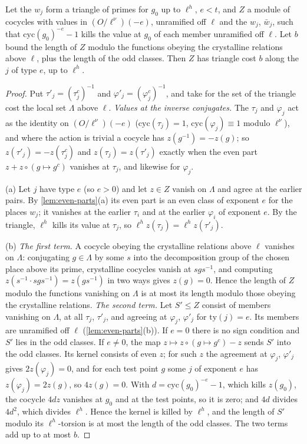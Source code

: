 \begin{theorem}\label{thm:triangle-cost}
Let the $w_j$ form a triangle of primes for $g_0$ up to $\ell^h$, $e<t$, and $Z$ a module of cocycles with values in $(O/\ell^\nu)(-e)$, unramified off $\ell$ and the $w_j$, $\bar w_j$, such that $\mathrm{cyc}(g_0)^{-e}-1$ kills the value at
$g_0$ of each member unramified off $\ell$. Let $b$ bound the length of $Z$ modulo the functions obeying the crystalline relations above $\ell$, plus the length of the odd classes. Then $Z$ has triangle cost $b$ along the $j$
of type $e$, up to $\ell^h$.
\end{theorem}

\begin{proof}
Put $\tau'_j=(\tau_j^c)^{-1}$ and $\varphi'_j=(\varphi_j^c)^{-1}$, and take for the set of the triangle cost the local set $\Lambda$ above $\ell$. \emph{Values at the inverse conjugates.} The $\tau_j$ and $\varphi_j$ act as the identity on $(O/\ell^\nu)(-e)$
($\mathrm{cyc}(\tau_j)=1$, $\mathrm{cyc}(\varphi_j)\equiv1$ modulo $\ell^\nu$), and where the action is trivial a cocycle has $z(g^{-1})=-z(g)$; so $z(\tau'_j)=-z(\tau_j^c)$ and $z(\tau_j)=z(\tau'_j)$ exactly when the even part $z+z\circ(g\mapsto g^c)$ vanishes at
$\tau_j$, and likewise for $\varphi_j$.

(a) Let $j$ have type $e$ (so $e>0$) and let $z\in Z$ vanish on $\Lambda$ and agree at the earlier pairs. By \cref{lem:even-parts}(a) its even part is an even class of exponent $e$ for the places $w_j$; it vanishes at the earlier $\tau_i$ and
at the earlier $\varphi_i$ of exponent $e$. By the triangle, $\ell^h$ kills its value at $\tau_j$, so $\ell^hz(\tau_j)=\ell^hz(\tau'_j)$.

(b) \emph{The first term.} A cocycle obeying the crystalline relations above $\ell$ vanishes on $\Lambda$: conjugating $g\in\Lambda$ by some $s$ into the decomposition group of the chosen place above its prime, crystalline cocycles vanish at
$sgs^{-1}$, and computing $z(s^{-1}\cdot sgs^{-1})=z(gs^{-1})$ in two ways gives $z(g)=0$. Hence the length of $Z$ modulo the functions vanishing on $\Lambda$ is at most its length modulo those obeying the crystalline relations.
\emph{The second term.} Let $S'\le Z$ consist of members vanishing on $\Lambda$, at all $\tau_j$, $\tau'_j$, and agreeing at $\varphi_j$, $\varphi'_j$ for $\mathrm{ty}(j)=e$. Its members are unramified off $\ell$ (\cref{lem:even-parts}(b)). If $e=0$ there is no sign condition and $S'$
lies in the odd classes. If $e\ne0$, the map $z\mapsto z\circ(g\mapsto g^c)-z$ sends $S'$ into the odd classes. Its kernel consists of even $z$; for such $z$ the agreement at $\varphi_j$, $\varphi'_j$ gives $2z(\varphi_j)=0$, and for each test point $g$
some $j$ of exponent $e$ has $z(\varphi_j)=2z(g)$, so $4z(g)=0$. With $d=\mathrm{cyc}(g_0)^{-e}-1$, which kills $z(g_0)$, the cocycle $4dz$ vanishes at $g_0$ and at the test points, so it is zero; and $4d$ divides $4d^2$, which divides
$\ell^h$. Hence the kernel is killed by $\ell^h$, and the length of $S'$ modulo its $\ell^h$-torsion is at most the length of the odd classes. The two terms add up to at most $b$.
\end{proof}
